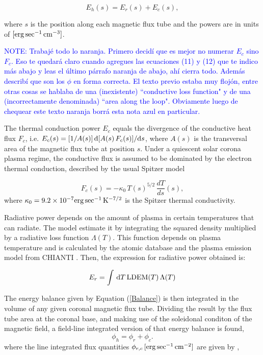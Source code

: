 \documentclass[namedreferences]{solarphysics}
\newcommand{\LDEM}{{\rm LDEM}}
\def\notebyalbert#1{\textcolor{blue}{NOTE: #1}}
\begin{document}
\begin{article}
\begin{equation}\label{Balance}
E_h(s) = E_r(s)+ E_c(s),
\end{equation}

\noindent
where $s$ is the position along each magnetic flux tube and the powers are in units of $[{\rm erg\,sec^{-1}\,cm^{-3}}]$.

\noindent\notebyalbert{Trabajé todo lo naranja. Primero decidí que es mejor no numerar $E_c$ sino $F_c$. Eso te quedará claro cuando agregues las ecuaciones (11) y (12) que te indico más abajo y leas el último párrafo naranja de abajo, ahí cierra todo. Además describí que son los $\phi$ en forma correcta. El texto previo estaba muy flojón, entre otras cosas se hablaba de una (inexistente) ``conductive loss function" y de una (incorrectamente denominada) ``area along the loop". Obviamente luego de chequear este texto naranja borrá esta nota azul en particular.}

{The thermal conduction power $E_c$ equals the divergence of the conductive heat flux $F_c$, i.e.
$E_c(s)=[1/A(s)]\,{\rm d}[A(s)\,F_c(s)]/{\rm d}s$, where $A(s)$ is the transversal area of the magnetic flux tube at position $s$. Under a quiescent solar corona plasma regime, the conductive flux is assumed to be dominated by the electron thermal conduction, described by the usual Spitzer model \citep{spitzer_1962}

\begin{equation}\label{Fc}
F_c(s)=-\kappa_0\,{T(s)}^{5/2}\,\frac{dT}{ds}(s),
\end{equation}
where $\kappa_0 = 9.2 \times 10^{-7}  {\rm erg\,sec^{-1}\,K^{-7/2}}$ is the Spitzer thermal conductivity.}

Radiative power depends on the amount of plasma in certain temperatures that can radiate. The model estimate it by integrating the squared density multiplied by a radiative loss function $\Lambda(T)$. This function depends on plasma temperature and is calculated by the atomic database and the plasma emission model from CHIANTI \citep{delzanna_2015}. Then, the expression for radiative power obtained is:

\begin{equation}\label{Er}
E_r = \int\,\textrm{d}T\,\LDEM(T)\,\Lambda(T)
\end{equation}

{The energy balance given by Equation (\ref{Balance}) is then integrated in the volume of any given coronal magnetic flux tube. Dividing the result by the flux tube area at the coronal base, and making use of the soleidonal conditon of the magnetic field, a field-line integrated version of that energy balance is found,
\begin{equation}\label{FluxBalance}
\phi_h = \phi_r + \phi_c.
\end{equation}
\noindent
where the line integrated flux quantities $\phi_{r,c}\,[\rm{erg\,sec^{-1}\,cm^{-2}}]$ are given by \citep{maccormack_2017},} \\



\end{article}
\end{document}
